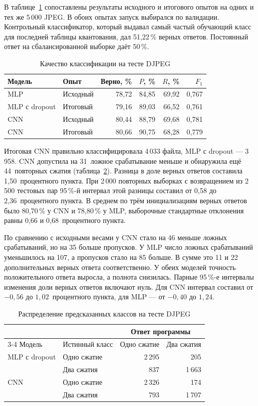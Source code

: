 В таблице~\ref{tab:quality} сопоставлены результаты исходного и итогового опытов на одних и тех же 5\,000 JPEG. В обоих опытах запуск выбирался по валидации. Контрольный классификатор, который выдавал самый частый обучающий класс для последней таблицы квантования, дал 51,22\,\% верных ответов. Постоянный ответ на сбалансированной выборке даёт 50\,\%.

\begin{table}[!htb]
 \caption{Качество классификации на тесте DJPEG}
 \label{tab:quality}
 \centering\small\singlespacing
 \begin{tabular}{@{}llrrrr@{}}
 \toprule
 Модель & Опыт & Верно, \% & $P$, \% & $R$, \% & $F_1$ \\
 \midrule
 MLP & Исходный & 78,72 & 84,85 & 69,92 & 0,767 \\
 MLP с dropout & Итоговый & 79,16 & 89,03 & 66,52 & 0,761 \\
 CNN & Исходный & 80,44 & 88,79 & 69,68 & 0,781 \\
 CNN & Итоговый & 80,66 & 90,75 & 68,28 & 0,779 \\
 \bottomrule
 \end{tabular}
\end{table}

Итоговая CNN правильно классифицировала 4\,033 файла, MLP с dropout --- 3\,958. CNN допустила на 31~ложное срабатывание меньше и обнаружила ещё 44~повторных сжатия (таблица~\ref{tab:errors}). Разница в доле верных ответов составила 1,50~процентного пункта. При 2\,000 повторных выборках с возвращением из 2\,500 тестовых пар 95\,\%-й интервал этой разницы составил от 0,58 до 2,36~процентного пункта. В среднем по трём инициализациям верных ответов было 80,70\,\% у CNN и 78,80\,\% у MLP, выборочные стандартные отклонения равны 0,66 и 0,68~процентного пункта.

По сравнению с исходными весами у CNN стало на 46 меньше ложных срабатываний, но на 35 больше пропусков. У MLP число ложных срабатываний уменьшилось на 107, а пропусков стало на 85 больше. В сумме это 11 и 22 дополнительных верных ответа соответственно. У обеих моделей точность положительного ответа выросла, а полнота снизилась. Парные 95\,\%-е интервалы изменения доли верных ответов включают нуль. Для CNN интервал составил от $-0{,}56$ до $1{,}02$~процентного пункта, для MLP --- от $-0{,}40$ до $1{,}24$.

\begin{table}[htbp]
 \caption{Распределение предсказанных классов на тесте DJPEG}
 \label{tab:errors}
 \centering\small\singlespacing
 \begin{tabular}{@{}llrr@{}}
 \toprule
 & & \multicolumn{2}{c}{Ответ программы} \\
 \cmidrule(l){3-4}
 Модель & Истинный класс & Одно сжатие & Два сжатия \\
 \midrule
 MLP с dropout & Одно сжатие & 2\,295 & 205 \\
     & Два сжатия  & 837 & 1\,663 \\
 \addlinespace
 CNN & Одно сжатие & 2\,326 & 174 \\
     & Два сжатия  & 793 & 1\,707 \\
 \bottomrule
 \end{tabular}
\end{table}

